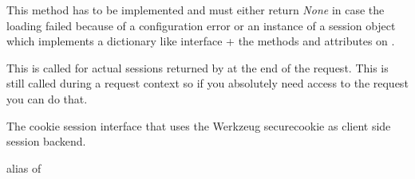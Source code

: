 \documentclass[a4paper,12pt]{sphinxmanual}
\begin{document}
\begin{fulllineitems}

\begin{fulllineitems}
\label{api:flask.sessions.SessionInterface.open_session}
This method has to be implemented and must either return \emph{None}
in case the loading failed because of a configuration error or an
instance of a session object which implements a dictionary like
interface + the methods and attributes on {\hyperref[api:flask.sessions.SessionMixin]{}}.

\end{fulllineitems}


\begin{fulllineitems}
\label{api:flask.sessions.SessionInterface.save_session}
This is called for actual sessions returned by {\hyperref[api:flask.sessions.SessionInterface.open_session]{}}
at the end of the request.  This is still called during a request
context so if you absolutely need access to the request you can do
that.

\end{fulllineitems}


\end{fulllineitems}


\begin{fulllineitems}
\label{api:flask.sessions.SecureCookieSessionInterface}
The cookie session interface that uses the Werkzeug securecookie
as client side session backend.

\begin{fulllineitems}
\label{api:flask.sessions.SecureCookieSessionInterface.session_class}
alias of 

\end{fulllineitems}


\end{fulllineitems}
\end{document}
